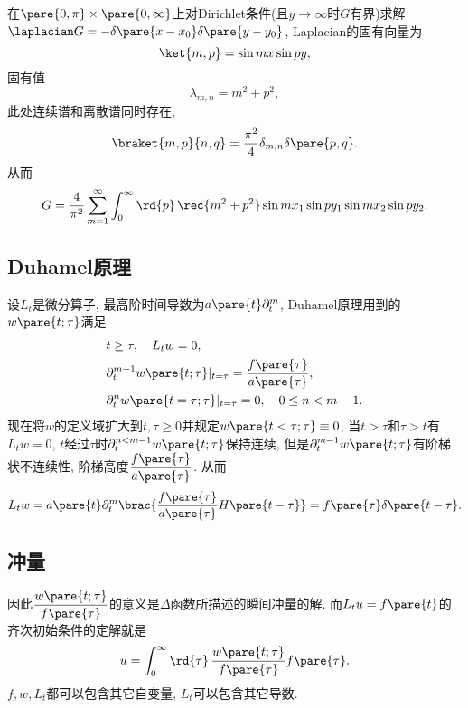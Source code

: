 \documentclass[hidelinks]{ctexart}
\begin{document}
\begin{sample}
    \begin{ex}
        在$\pare{0,\pi}\times \pare{0,\infty}$上对Dirichlet条件(且$y\rightarrow \infty$时$G$有界)求解$\laplacian G = -\delta\pare{x-x_0}\delta\pare{y-y_0}$, Laplacian的固有向量为
        \[ \ket{m,p} = \sin mx \sin py, \]
        固有值
        \[ \lambda_{m,n} = m^2 + p^2, \]
        此处连续谱和离散谱同时存在,
        \[ \braket{m,p}{n,q} = \frac{\pi^2}{4}\delta_{m,n}\delta\pare{p,q}. \]
        从而
        \[ G = \frac{4}{\pi^2} \sum_{m=1}^\infty \int_0^\infty\rd{p}\, \rec{m^2 + p^2} \sin mx_1 \sin py_1 \sin mx_2 \sin py_2. \] 
    \end{ex}
\end{sample}


\subsection{Duhamel原理} %
\label{sub:duhamel原理}

\newpoint{}设$L_t$是微分算子, 最高阶时间导数为$a\pare{t}\partial_t^m$, Duhamel原理用到的$w\pare{t;\tau}$满足
\begin{align*}
    & t\ge \tau,\quad L_t w = 0, \\
    & \partial_t^{m-1}w\pare{t;\tau}\vert_{t=\tau} = \frac{f\pare{\tau}}{a\pare{\tau}}, \\
    & \partial_t^n w\pare{t=\tau;\tau}\vert_{t=\tau} = 0,\quad 0\le n < m-1.
\end{align*}
现在将$w$的定义域扩大到$t,\tau \ge 0$并规定$w\pare{t<\tau;\tau} \equiv 0$, 当$t>\tau$和$\tau >t$有$L_t w = 0$, $t$经过$\tau$时$\partial_t^{n<m-1} w\pare{t;\tau}$保持连续, 但是$\partial_t^{m-1} w\pare{t;\tau}$有阶梯状不连续性, 阶梯高度$\displaystyle \frac{f\pare{\tau}}{a\pare{\tau}}$. 从而
\[ L_t w = a\pare{t} \partial_t^m \brac{\frac{f\pare{\tau}}{a\pare{\tau}} H\pare{t-\tau}} = f\pare{\tau}\delta\pare{t-\tau}. \]


\subsection{冲量} %
\label{sub:冲量}

\newpoint{}因此$\displaystyle \frac{w\pare{t;\tau}}{f\pare{\tau}}$的意义是$\Delta$函数所描述的瞬间冲量的解.
\newpoint{}而$L_tu = f\pare{t}$的齐次初始条件的定解就是
\[ u = \int_0^\infty \rd{\tau}\, \frac{w\pare{t;\tau}}{f\pare{\tau}}f\pare{\tau}. \]
$f,w,L_t$都可以包含其它自变量, $L_t$可以包含其它导数.
\end{document}
